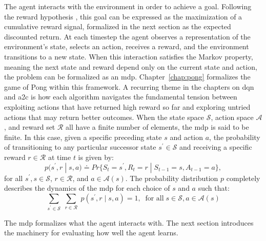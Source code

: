 The agent interacts with the environment in order to achieve a goal. Following the reward hypothesis \citep[p.~53]{suttonReinforcementLearningIntroduction2020}, this goal can be expressed as the maximization of a cumulative reward signal, formalized in the next section as the expected discounted return. At each timestep the agent observes a representation of the environment's state, selects an action, receives a reward, and the environment transitions to a new state. When this interaction satisfies the Markov property, meaning the next state and reward depend only on the current state and action, the problem can be formalized as an \acrshort{mdp}. Chapter~\ref{chap:pong} formalizes the game of Pong within this framework. A recurring theme in the chapters on \acrshort{dqn} and \acrshort{a2c} is how each algorithm navigates the fundamental tension between exploiting actions that have returned high reward so far and exploring untried actions that may return better outcomes. When the state space $\mathcal{S}$, action space $\mathcal{A}$, and reward set $\mathcal{R}$ all have a finite number of elements, the \acrshort{mdp} is said to be finite. In this case, given a specific preceding state $s$ and action $a$, the probability of transitioning to any particular successor state $s^{\prime} \in \mathcal{S}$ and receiving a specific reward $r \in \mathcal{R}$ at time $t$ is given by:
\begin{equation}\label{eq:finite_mdp}
	p(s^{\prime}, r\;|\;s, a) \doteq Pr\{S_t = s^{\prime}, R_t = r\;| \;S_{t-1} = s, A_{t-1} = a\},
\end{equation}
for all $s^{\prime}, s \in \mathcal{S}$, $r \in \mathcal{R}$, and $a \in \mathcal{A}(s)$. The probability distribution $p$ completely describes the  dynamics of the \acrshort{mdp} for each choice of $s$ and $a$ such that:
\begin{equation}
	\sum_{s^{\prime} \in \mathcal{S}}\;\sum_{r \in \mathcal{R}}\;p(s^{\prime}, r\;|\;s, a) = 1,\;\;\text{for all}\; s \in \mathcal{S}, a \in \mathcal{A}(s)
\end{equation}

The \acrshort{mdp} formalizes what the agent interacts with. The next section introduces the machinery for evaluating how well the agent learns.

